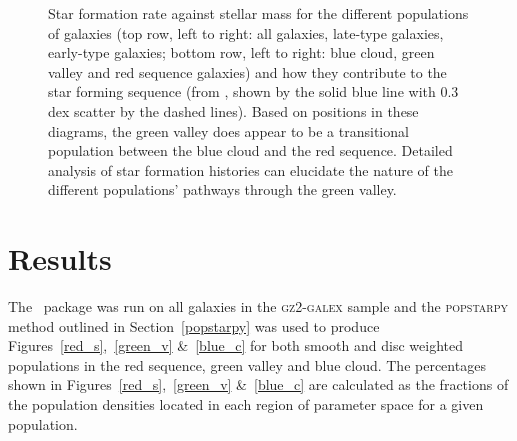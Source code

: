 \begin{figure}
\caption[SFR-stellar mass plane split by morphology and colour]{Star formation rate against stellar mass for the different populations of galaxies (top row, left to right: all galaxies, late-type galaxies, early-type galaxies; bottom row, left to right: blue cloud, green valley and red sequence galaxies) and how they contribute to the star forming sequence (from \citet{peng10}, shown by the solid blue line with 0.3 dex scatter by the dashed lines). Based on positions in these diagrams, the green valley does appear to be a transitional population between the blue cloud and the red sequence. Detailed analysis of star formation histories can elucidate the nature of the different populations' pathways through the green valley.}
\label{sfr_mass_sub}
\end{figure}


\section{Results}

The \starpy ~package was run on all galaxies in the \textsc{gz2-galex} sample and the \textsc{popstarpy} method outlined in Section~\ref{popstarpy} was used  to produce Figures~\ref{red_s},~\ref{green_v} \&~\ref{blue_c} for both smooth and disc weighted populations in the red sequence, green valley and blue cloud. The percentages shown in Figures~\ref{red_s},~\ref{green_v} \&~\ref{blue_c} are calculated as the fractions of the population densities located in each region of parameter space for a given population. 

